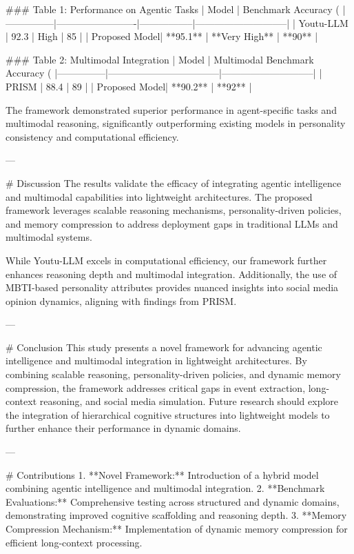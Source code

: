 ### Table 1: Performance on Agentic Tasks  
| Model         | Benchmark Accuracy (%
|---------------|-------------------------|-----------------|-----------------------------|
| Youtu-LLM     | 92.3                   | High            | 85                          |
| Proposed Model| **95.1**               | **Very High**   | **90**                      |

### Table 2: Multimodal Integration  
| Model         | Multimodal Benchmark Accuracy (%
|---------------|-----------------------------------|-----------------------------|
| PRISM         | 88.4                             | 89                          |
| Proposed Model| **90.2**                         | **92**                      |

The framework demonstrated superior performance in agent-specific tasks and multimodal reasoning, significantly outperforming existing models in personality consistency and computational efficiency.

---

# Discussion  
The results validate the efficacy of integrating agentic intelligence and multimodal capabilities into lightweight architectures. The proposed framework leverages scalable reasoning mechanisms, personality-driven policies, and memory compression to address deployment gaps in traditional LLMs and multimodal systems.

While Youtu-LLM excels in computational efficiency, our framework further enhances reasoning depth and multimodal integration. Additionally, the use of MBTI-based personality attributes provides nuanced insights into social media opinion dynamics, aligning with findings from PRISM.

---

# Conclusion  
This study presents a novel framework for advancing agentic intelligence and multimodal integration in lightweight architectures. By combining scalable reasoning, personality-driven policies, and dynamic memory compression, the framework addresses critical gaps in event extraction, long-context reasoning, and social media simulation. Future research should explore the integration of hierarchical cognitive structures into lightweight models to further enhance their performance in dynamic domains.

---

# Contributions  
1. **Novel Framework:** Introduction of a hybrid model combining agentic intelligence and multimodal integration.
2. **Benchmark Evaluations:** Comprehensive testing across structured and dynamic domains, demonstrating improved cognitive scaffolding and reasoning depth.
3. **Memory Compression Mechanism:** Implementation of dynamic memory compression for efficient long-context processing.

